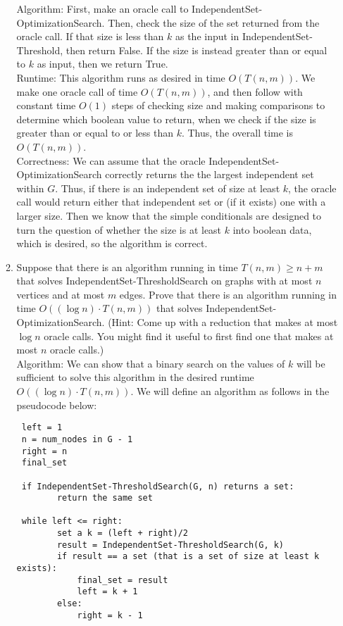 \documentclass[11pt]{article}
\begin{document}
\begin{enumerate}
\begin{enumerate}
Algorithm: First, make an oracle call to IndependentSet-OptimizationSearch. Then, check the size of the set returned from the oracle call. If that size is less than $k$ as the input in IndependentSet-Threshold, then return False. If the size is instead greater than or equal to $k$ as input, then we return True. \\

Runtime: This algorithm runs as desired in time $O(T(n,m))$. We make one oracle call of time $O(T(n,m))$, and then follow with constant time $O(1)$ steps of checking size and making comparisons to determine which boolean value to return, when we check if the size is greater than or equal to or less than $k$. Thus, the overall time is $O(T(n,m))$. \\

Correctness: We can assume that the oracle IndependentSet-OptimizationSearch correctly returns the the largest independent set within $G$. Thus, if there is an independent set of size at least $k$, the oracle call would return either that independent set or (if it exists) one with a larger size. Then we know that the simple conditionals are designed to turn the question of whether the size is at least $k$ into boolean data, which is desired, so the algorithm is correct. 
 
 \item Suppose that there is an algorithm running in time $T(n,m)\geq n+m$ that solves IndependentSet-ThresholdSearch on graphs with at most $n$ vertices and at most $m$ edges.  Prove that there is an algorithm running in time $O((\log n)\cdot T(n,m))$ that solves IndependentSet-OptimizationSearch.  (Hint: Come up with a reduction that makes at most $\log n$ oracle calls.  You might find it useful to first find one that makes at most $n$ oracle calls.) \\
 
 Algorithm: We can show that a binary search on the values of $k$ will be sufficient to solve this algorithm in the desired runtime $O((\log n)\cdot T(n,m))$. We will define an algorithm as follows in the pseudocode below:
 
 \begin{lstlisting}
 left = 1
 n = num_nodes in G - 1
 right = n
 final_set
 
 if IndependentSet-ThresholdSearch(G, n) returns a set:
        return the same set
 
 while left <= right:
        set a k = (left + right)/2
        result = IndependentSet-ThresholdSearch(G, k)
        if result == a set (that is a set of size at least k exists):
            final_set = result
            left = k + 1
        else: 
            right = k - 1
            

\end{lstlisting}
\end{enumerate}
\end{enumerate}
\end{document}
